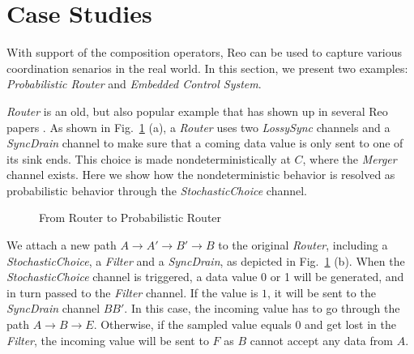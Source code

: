 \section{Case Studies}
\label{sec:casestudies}


With support of the composition operators, Reo can be used to capture various coordination senarios in the real world. In this section, we present two examples: \emph{Probabilistic Router} and \emph{Embedded Control System}.


\begin{example}
\emph{Router} is an old, but also popular example that has shown up in several Reo papers \cite{Baier2006a,Arbab2006}. As shown in Fig.~\ref{fig:router} (a), a \emph{Router} uses two \emph{LossySync} channels and a \emph{SyncDrain} channel to make sure that a coming data value is only sent to one of its sink ends. This choice is made nondeterministically at $C$, where the \emph{Merger} channel exists. Here we show how the nondeterministic behavior is resolved as probabilistic behavior through the \emph{StochasticChoice} channel.


\begin{figure}[H]
    \centering
    
    \caption{From Router to Probabilistic Router}
    \label{fig:router}
\end{figure}

We attach a new path $A\rightarrow A'\rightarrow B'\rightarrow B$ to the original \emph{Router}, including a \emph{StochasticChoice}, a \emph{Filter} and a \emph{SyncDrain}, as depicted in Fig.~\ref{fig:router} (b).
When the \emph{StochasticChoice} channel is triggered, a data value 0 or 1 will be generated, and in turn passed to the \emph{Filter} channel. If the value is $1$, it will be sent to the \emph{SyncDrain} channel $BB'$. In this case, the incoming value has to go through the path $A\rightarrow B\rightarrow E$. Otherwise, if the sampled value equals $0$ and get lost in the \emph{Filter}, the incoming value will be sent to $F$ as $B$ cannot accept any data from $A$.



\end{example}
